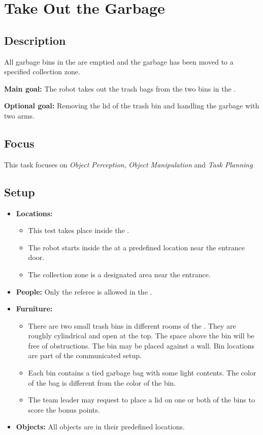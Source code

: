 \section{Take Out the Garbage}
\label{test:take-out-the-garbage}

\subsection*{Description}
	All garbage bins in the \Arena{} are emptied and the garbage has been moved to a specified collection zone.

\textbf{Main goal:}
	The robot takes out the trash bags from the two bins in the \Arena{}.

\textbf{Optional goal:}
	Removing the lid of the trash bin and handling the garbage with two arms.

\subsection*{Focus}
	This task focuses on 
	\textit{Object Perception},
	\textit{Object Manipulation} and
	\textit{Task Planning}

\subsection*{Setup}
\begin{itemize}[nosep]	
	\item \textbf{Locations:}
		\begin{itemize}
			\item This test takes place inside the \Arena{}.
			\item The robot starts inside the \Arena{} at a predefined location near the entrance door.
			\item The collection zone is a designated area near the entrance.
		\end{itemize}
	\item \textbf{People:} Only the referee is allowed in the \Arena{}.
	\item \textbf{Furniture:} 
		\begin{itemize}
			\item There are two small trash bins in different rooms of the \Arena{}. They are roughly cylindrical and open at the top. The space above the bin will be free of obstructions. The bin may be placed against a wall. Bin locations are part of the communicated \Arena{} setup.
			\item Each bin contains a tied garbage bag with some light contents. The color of the bag is different from the color of the bin.
			\item The team leader may request to place a lid on one or both of the bins to score the bonus points.
		\end{itemize}
	\item \textbf{Objects:} All objects are in their predefined locations.
\end{itemize}

